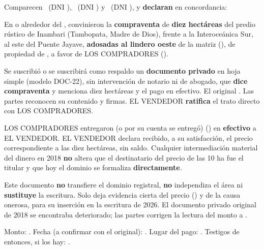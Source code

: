 \documentclass[12pt,a4paper]{article}
\begin{document}


\noindent Comparecen \VendedorNombreCompleto\ (DNI \VendedorDNI), \CompradorUnoNombre\ (DNI \CompradorUnoDNI) y \CompradorDosNombre\ (DNI \CompradorDosDNI), y \textbf{declaran} en concordancia:

En o alrededor del \textbf{\FechaPago}, convinieron la \textbf{compraventa} de \textbf{diez hectáreas} del predio rústico de Inambari (Tambopata, Madre de Dios), frente a la Interoceánica Sur, al este del Puente Jayave, \textbf{adosadas al lindero oeste} de la matriz (\CriterioRecorte), de propiedad de \VendedorNombreCompleto, a favor de LOS COMPRADORES (\CompradorParentesco).

Se suscribió o se suscribirá como respaldo un \textbf{documento privado} en hoja simple (modelo DOC-22), sin intervención de notario ni de abogado, que \textbf{dice compraventa} y menciona diez hectáreas y el pago en efectivo. El original . Las partes reconocen su contenido y firmas. EL VENDEDOR \textbf{ratifica} el trato directo con LOS COMPRADORES.

LOS COMPRADORES entregaron (o por su cuenta se entregó) \textbf{\MontoPago} (\MontoPagoLetras) en \textbf{efectivo} a EL VENDEDOR. EL VENDEDOR declara recibido, a su satisfacción, el precio correspondiente a las diez hectáreas, sin saldo. Cualquier intermediación material del dinero en 2018 \textbf{no} altera que el destinatario del precio de las 10 ha fue el titular y que hoy el dominio se formaliza \textbf{directamente}.

Este documento \textbf{no} transfiere el dominio registral, \textbf{no} independiza el área ni \textbf{sustituye} la escritura. Solo deja evidencia cierta del precio (\MontoPago) y de la causa onerosa, para su inserción en la escritura de 2026. El documento privado original de 2018 se encontraba deteriorado; las partes corrigen la lectura del monto a \MontoPago.

Monto: \MontoPago. Fecha (a confirmar con el original): \FechaPago. Lugar del pago: . Testigos de entonces, si los hay: .
\end{document}

